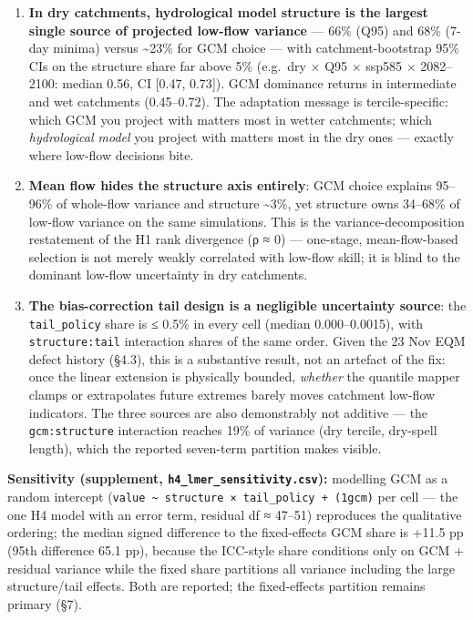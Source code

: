 \documentclass[
  english,
  11pt,
]{article}
\providecommand{\tightlist}{%
  \setlength{\itemsep}{0pt}\setlength{\parskip}{0pt}}
\begin{document}
\begin{enumerate}
\def\labelenumi{\arabic{enumi}.}
\tightlist
\item
  \textbf{In dry catchments, hydrological model structure is the largest
  single source of projected low-flow variance} --- 66\% (Q95) and 68\%
  (7-day minima) versus \textasciitilde23\% for GCM choice --- with
  catchment-bootstrap 95\% CIs on the structure share far above 5\%
  (e.g.~dry × Q95 × ssp585 × 2082--2100: median 0.56, CI {[}0.47,
  0.73{]}). GCM dominance returns in intermediate and wet catchments
  (0.45--0.72). The adaptation message is tercile-specific: which GCM
  you project with matters most in wetter catchments; which
  \emph{hydrological model} you project with matters most in the dry
  ones --- exactly where low-flow decisions bite.
\item
  \textbf{Mean flow hides the structure axis entirely}: GCM choice
  explains 95--96\% of whole-flow variance and structure
  \textasciitilde3\%, yet structure owns 34--68\% of low-flow variance
  on the same simulations. This is the variance-decomposition
  restatement of the H1 rank divergence (ρ ≈ 0) --- one-stage,
  mean-flow-based selection is not merely weakly correlated with
  low-flow skill; it is blind to the dominant low-flow uncertainty in
  dry catchments.
\item
  \textbf{The bias-correction tail design is a negligible uncertainty
  source}: the \texttt{tail\_policy} share is ≤ 0.5\% in every cell
  (median 0.000--0.0015), with \texttt{structure:tail} interaction
  shares of the same order. Given the 23 Nov EQM defect history (§4.3),
  this is a substantive result, not an artefact of the fix: once the
  linear extension is physically bounded, \emph{whether} the quantile
  mapper clamps or extrapolates future extremes barely moves catchment
  low-flow indicators. The three sources are also demonstrably not
  additive --- the \texttt{gcm:structure} interaction reaches 19\% of
  variance (dry tercile, dry-spell length), which the reported
  seven-term partition makes visible.
\end{enumerate}

\textbf{Sensitivity (supplement, \texttt{h4\_lmer\_sensitivity.csv}):}
modelling GCM as a random intercept
(\texttt{value\ \textasciitilde{}\ structure\ ×\ tail\_policy\ +\ (1\textbar{}gcm)}
per cell --- the one H4 model with an error term, residual df ≈ 47--51)
reproduces the qualitative ordering; the median signed difference to the
fixed-effects GCM share is +11.5 pp (95th \textbar difference\textbar{}
65.1 pp), because the ICC-style share conditions only on GCM + residual
variance while the fixed share partitions all variance including the
large structure/tail effects. Both are reported; the fixed-effects
partition remains primary (§7).
\end{document}
